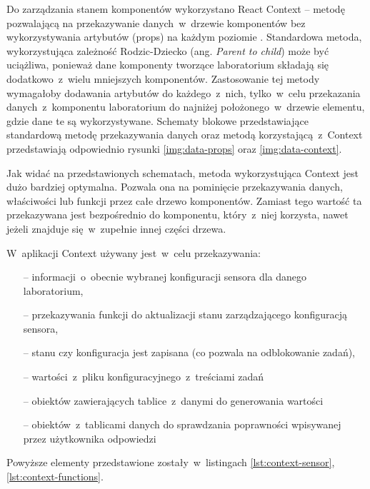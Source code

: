 Do zarządzania stanem komponentów wykorzystano React Context -- metodę pozwalającą na przekazywanie
danych~w~drzewie komponentów bez wykorzystywania artybutów (props) na każdym poziomie
\cite{react-docs}. Standardowa metoda, wykorzystująca zależność Rodzic-Dziecko (ang. \textit{Parent
  to child}) może być uciążliwa, ponieważ dane komponenty tworzące laboratorium składają się
dodatkowo~z~wielu mniejszych komponentów. Zastosowanie tej metody wymagałoby dodawania artybutów do
każdego~z~nich, tylko~w~celu przekazania danych~z~komponentu laboratorium do najniżej
położonego~w~drzewie elementu, gdzie dane te są wykorzystywane. Schematy blokowe przedstawiające
standardową metodę przekazywania danych oraz metodą korzystającą~z~Context przedstawiają odpowiednio
rysunki \ref{img:data-props} oraz \ref{img:data-context}.



Jak widać na przedstawionych schematach, metoda wykorzystująca Context jest dużo bardziej optymalna.
Pozwala ona na pominięcie przekazywania danych, właściwości lub funkcji przez całe drzewo
komponentów. Zamiast tego wartość ta przekazywana jest bezpośrednio do komponentu, który~z~niej
korzysta, nawet jeżeli znajduje się~w~zupełnie innej części drzewa.

W~aplikacji Context używany jest~w~celu przekazywania:
\begin{itemize}
  \item[--] informacji~o~obecnie wybranej konfiguracji sensora dla danego laboratorium,
  \item[--] przekazywania funkcji do aktualizacji stanu zarządzającego konfiguracją sensora,
  \item[--] stanu czy konfiguracja jest zapisana (co pozwala na odblokowanie zadań),
  \item[--] wartości~z~pliku konfiguracyjnego~z~treściami zadań
  \item[--] obiektów zawierających tablice~z~danymi do generowania wartości
  \item[--] obiektów~z~tablicami danych do sprawdzania poprawności wpisywanej przez użytkownika
        odpowiedzi
\end{itemize}
Powyższe elementy przedstawione zostały~w~listingach \ref{lst:context-sensor},
\ref{lst:context-functions}.


